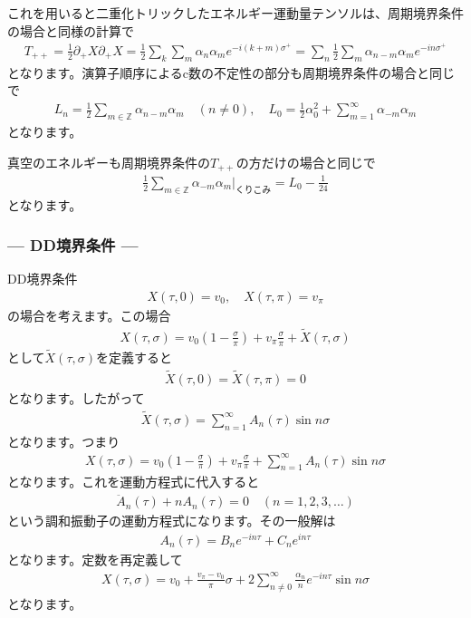 \documentclass[report,paper=a4, fontsize=12pt, line_length=16cm, number_of_lines=34,dvipdfmx]{jlreq}
\numberwithin{equation}{chapter}
\numberwithin{equation}{section}
\newcommand{\Zb}{\mathbb{Z}}
\newcommand{\del}{\partial}
\begin{document}
これを用いると二重化トリックしたエネルギー運動量テンソルは、周期境界条件の場合と同様の計算で
\begin{align}
  T_{++}=\frac12 \del_{+}X\del_{+}X
  =\frac12 \sum_{k}\sum_{m}\alpha_{n}\alpha_{m}e^{-i(k+m)\sigma^{+}}
  =\sum_{n}\frac12\sum_{m}\alpha_{n-m}\alpha_{m}e^{-in\sigma^{+}}
\end{align}
となります。演算子順序によるc数の不定性の部分も周期境界条件の場合と同じで
\begin{align}
  L_{n}=\frac12\sum_{m\in\Zb}\alpha_{n-m}\alpha_{m} \quad (n\ne 0),\quad
  L_{0}=\frac12 \alpha_{0}^2+\sum_{m=1}^{\infty}\alpha_{-m}\alpha_{m}
\end{align}
となります。

真空のエネルギーも周期境界条件の$T_{++}$の方だけの場合と同じで
\begin{align}
  \frac12\sum_{m\in\Zb}\alpha_{-m}\alpha_{m}\Bigg|_{\text{くりこみ}}=L_{0}-\frac{1}{24}
\end{align}
となります。

\subsubsection*{--- DD境界条件 ---}
DD境界条件
\begin{align}
  X(\tau,0)=v_0,\quad X(\tau,\pi)=v_{\pi}
\end{align}
の場合を考えます。この場合
\begin{align}
  X(\tau,\sigma)=v_{0}\left( 1-\frac{\sigma}{\pi} \right)+v_{\pi}\frac{\sigma}{\pi}+\widetilde{X}(\tau,\sigma)
\end{align}
として$\widetilde{X}(\tau,\sigma)$を定義すると
\begin{align}
  \widetilde{X}(\tau,0)=\widetilde{X}(\tau,\pi)=0
\end{align}
となります。したがって
\begin{align}
  \widetilde{X}(\tau,\sigma)=\sum_{n=1}^{\infty}A_{n}(\tau)\sin n\sigma
\end{align}
となります。つまり
\begin{align}
  X(\tau,\sigma)=v_{0}\left( 1-\frac{\sigma}{\pi} \right)+v_{\pi}\frac{\sigma}{\pi}+\sum_{n=1}^{\infty}A_{n}(\tau)\sin n\sigma
\end{align}
となります。これを運動方程式に代入すると
\begin{align}
  \ddot{A}_{n}(\tau)+nA_{n}(\tau)=0 \quad (n=1,2,3,\dots)
\end{align}
という調和振動子の運動方程式になります。その一般解は
\begin{align}
  A_{n}(\tau)=B_{n}e^{-in\tau}+C_{n}e^{in\tau}
\end{align}
となります。定数を再定義して
\begin{align}
  X(\tau,\sigma)=v_{0}+\frac{v_{\pi}-v_{0}}{\pi}\sigma+2\sum_{n\ne 0}^{\infty}\frac{\alpha_{n}}{n}e^{-in\tau}\sin n\sigma
\end{align}
となります。
\end{document}

